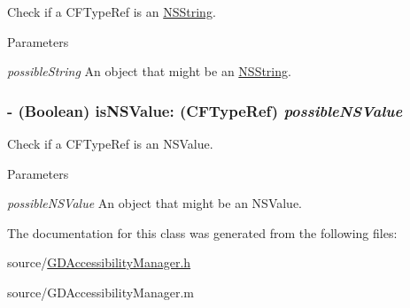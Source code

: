 Check if a CFTypeRef is an \hyperlink{class_n_s_string}{NSString}. 
\begin{DoxyParams}{Parameters}
\item[{\em possibleString}]An object that might be an \hyperlink{class_n_s_string}{NSString}. \end{DoxyParams}
\hypertarget{interface_g_d_accessibility_manager_acdce820e06d533b51a1eaec8618019c1}{
\subsubsection[{isNSValue:}]{\setlength{\rightskip}{0pt plus 5cm}-\/ (Boolean) isNSValue: (CFTypeRef) {\em possibleNSValue}}}
\label{interface_g_d_accessibility_manager_acdce820e06d533b51a1eaec8618019c1}


Check if a CFTypeRef is an NSValue. 
\begin{DoxyParams}{Parameters}
\item[{\em possibleNSValue}]An object that might be an NSValue. \end{DoxyParams}


The documentation for this class was generated from the following files:\begin{DoxyCompactItemize}
\item 
source/\hyperlink{_g_d_accessibility_manager_8h}{GDAccessibilityManager.h}\item 
source/GDAccessibilityManager.m\end{DoxyCompactItemize}
